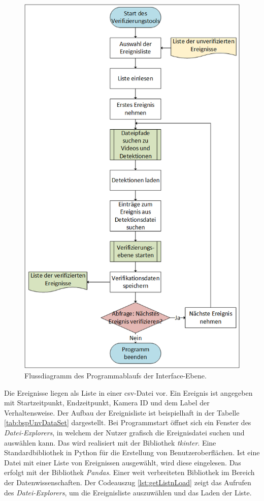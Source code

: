 \begin{figure}[p]
    \centering
    \includegraphics[height=0.9\textheight]{img/Grafiken/Flussdiagramm Interface-Ebene.png}
    \caption[Flussdiagramm des Programmablaufs der Interface-Ebene.]{Flussdiagramm des Programmablaufs der Interface-Ebene.}
    \label{fig:FlussDia IntefaceEbene}
\end{figure}

Die Ereignisse liegen als Liste in einer csv-Datei vor. Ein Ereignis ist angegeben mit Startzeitpunkt, Endzeitpunkt, Kamera ID und dem Label der Verhaltensweise. Der Aufbau der Ereignisliste ist beispielhaft in der Tabelle \ref{tab:bspUnvDataSet} dargestellt. Bei Programmstart öffnet sich ein Fenster des \textit{Datei-Explorers}, in welchem der Nutzer grafisch die Ereignisdatei suchen und auswählen kann. Das wird realisiert mit der \gls{Bibliothek} \textit{tkinter}. Eine Standardbibliothek in Python für die Erstellung von Benutzeroberflächen. Ist eine Datei mit einer Liste von Ereignissen ausgewählt, wird diese eingelesen. Das erfolgt mit der Bibliothek \textit{Pandas}. Einer weit verbreiteten Bibliothek im Bereich der Datenwissenschaften. Der Codeauszug \ref{lst:getListnLoad} zeigt das Aufrufen des \textit{Datei-Explorers}, um die Ereignisliste auszuwählen und das Laden der Liste.

